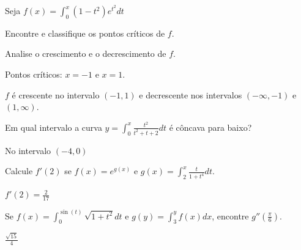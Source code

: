 \begin{exercises}
\begin{exercise}
Seja \(f(x)=\int_0^x (1-t^2)e^{t^2} dt\)
\begin{alphalist}
  \item Encontre  e classifique os pontos críticos de $f$.
  \item Analise o crescimento e o decrescimento de $f$.
\end{alphalist}
\begin{answer}
  \begin{alphalist}
    \item Pontos críticos: $x=-1$ e $x=1$.
    \item $f$ é crescente no intervalo $(-1,1)$ e decrescente nos
          intervalos $(-\infty,-1)$ e $(1, \infty)$.
  \end{alphalist}
\end{answer}
\end{exercise}

\begin{exercise}
Em qual intervalo a curva $y= \int_0^x \frac{t^2}{t^2+t+2} dt$
é côncava para baixo?
\begin{answer}
  No intervalo $(-4,0)$
\end{answer}
\end{exercise}

\begin{exercise}
Calcule $f'(2)$ se $f(x)= e^{g(x)}$ e $g(x)= \int_2^x \frac{t}{1+t^4}dt$.
\begin{answer}
  $f'(2)=\frac{2}{17}$
\end{answer}
\end{exercise}

\begin{exercise}
Se $f(x)= \int_0^{\sin(t)} \sqrt{1+t^2} dt$ e $g(y)= \int_3^y f(x)dx$,
encontre $g''(\frac{\pi}{6})$.
\begin{answer}
  $\frac{\sqrt{15}}{4}$
\end{answer}
\end{exercise}


\end{exercises}
